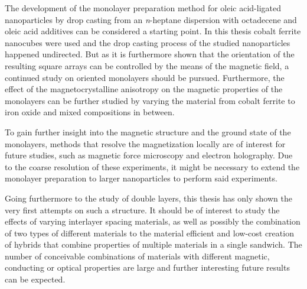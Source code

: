 \documentclass[\main/dresen_thesis.tex]{subfiles}
\begin{document}
    The development of the monolayer preparation method for oleic acid-ligated nanoparticles by drop casting from an \textit{n}-heptane dispersion with octadecene and oleic acid additives can be considered a starting point.
    In this thesis cobalt ferrite nanocubes were used and the drop casting process of the studied nanoparticles happened undirected.
    But as it is furthermore shown that the orientation of the resulting square arrays can be controlled by the means of the magnetic field, a continued study on oriented monolayers should be pursued.
    Furthermore, the effect of the magnetocrystalline anisotropy on the magnetic properties of the monolayers can be further studied by varying the material from cobalt ferrite to iron oxide and mixed compositions in between.

    To gain further insight into the magnetic structure and the ground state of the monolayers, methods that resolve the magnetization locally are of interest for future studies, such as magnetic force microscopy and electron holography.
    Due to the coarse resolution of these experiments, it might be necessary to extend the monolayer preparation to larger nanoparticles to perform said experiments.

    Going furthermore to the study of double layers, this thesis has only shown the very first attempts on such a structure.
    It should be of interest to study the effects of varying interlayer spacing materials, as well as possibly the combination of two types of different materials to the material efficient and low-cost creation of hybrids that combine properties of multiple materials in a single sandwich.
    The number of conceivable combinations of materials with different magnetic, conducting or optical properties are large and further interesting future results can be expected.
\end{document}
